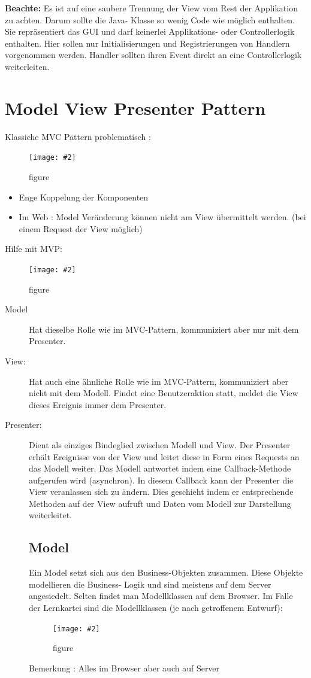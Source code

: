 \documentclass[a4paper,10pt]{scrreprt}
\newcommand{\pic}[2][figure]{\begin{figure}[h]
 \centering
 \texttt{[image: \#2]}
 \caption{#1}
\end{figure}
}
\begin{document}
\textbf{Beachte:}
Es ist auf eine saubere Trennung der View vom Rest der Applikation zu achten. Darum sollte die Java-
Klasse so wenig Code wie möglich enthalten. Sie repräsentiert das GUI und darf keinerlei Applikations-
oder Controllerlogik enthalten. Hier sollen nur Initialisierungen und Registrierungen von Handlern
vorgenommen werden. Handler sollten ihren Event direkt an eine Controllerlogik weiterleiten.

\chapter{Model View Presenter Pattern}

Klassiche MVC Pattern problematisch :
\pic{mvc.png}
\begin{itemize}
 \item Enge Koppelung der Komponenten
 \item Im Web : Model Veränderung können nicht am View übermittelt werden. (bei einem Request der View möglich)
\end{itemize}

Hilfe mit MVP:
\pic{mvp1.png}

\begin{description}
 \item [Model] Hat dieselbe Rolle wie im MVC-Pattern, kommuniziert aber nur mit dem Presenter.
\item[View:] Hat auch eine ähnliche Rolle wie im MVC-Pattern, kommuniziert aber nicht mit dem Modell.
Findet eine Benutzeraktion statt, meldet die View dieses Ereignis immer dem Presenter.
\item[Presenter:] Dient als einziges Bindeglied zwischen Modell und View. Der Presenter erhält Ereignisse
von der View und leitet diese in Form eines Requests an das Modell weiter. Das Modell antwortet
indem eine Callback-Methode aufgerufen wird (asynchron). In diesem Callback kann der Presenter
die View veranlassen sich zu ändern. Dies geschieht indem er entsprechende Methoden auf der
View aufruft und Daten vom Modell zur Darstellung weiterleitet.

\section{Model}
Ein Model setzt sich aus den Business-Objekten zusammen. Diese Objekte modellieren die Business-
Logik und sind meistens auf dem Server angesiedelt. Selten findet man Modellklassen auf dem
Browser. Im Falle der Lernkartei sind die Modellklassen (je nach getroffenem Entwurf):
\pic{mvpmodel.png}
Bemerkung : Alles im Browser aber auch auf Server
\end{description}
\end{document}
